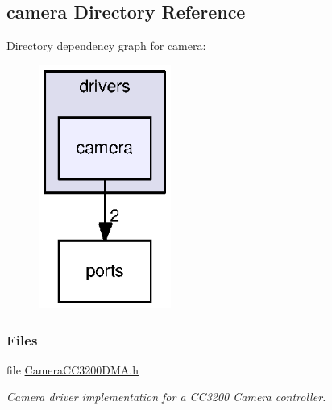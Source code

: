 \subsection{camera Directory Reference}
\label{dir_6a021109eee292c572f9bd13b3b1bb0c}
Directory dependency graph for camera\+:
\nopagebreak
\begin{figure}[H]
\begin{center}
\leavevmode
\includegraphics[width=123pt]{dir_6a021109eee292c572f9bd13b3b1bb0c_dep}
\end{center}
\end{figure}
\subsubsection*{Files}
\begin{DoxyCompactItemize}
\item 
file \hyperlink{_camera_c_c3200_d_m_a_8h}{Camera\+C\+C3200\+D\+M\+A.\+h}
\begin{DoxyCompactList}\small\item\em Camera driver implementation for a C\+C3200 Camera controller. \end{DoxyCompactList}\end{DoxyCompactItemize}
